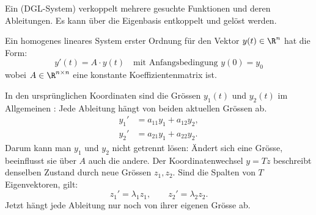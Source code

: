 \ZSFNewColumn
{}

\begin{runintext}
Ein  (DGL-System) verkoppelt mehrere gesuchte Funktionen und deren Ableitungen. Es kann über die Eigenbasis entkoppelt und gelöst werden.
\end{runintext}


\begin{defbox}
Ein homogenes lineares System erster Ordnung für den Vektor $y(t) \in \R^n$ hat die Form:
\[ y'(t) = A \cdot y(t) \quad \text{mit Anfangsbedingung } y(0) = y_0 \]
wobei $A \in \R^{n \times n}$ eine konstante Koeffizientenmatrix ist.
\end{defbox}


\begin{defbox}
In den ursprünglichen Koordinaten sind die Grössen $y_1(t)$ und $y_2(t)$ im Allgemeinen : Jede Ableitung hängt von beiden aktuellen Grössen ab.
\[
  \begin{aligned}
    y_1' &= a_{11}y_1+a_{12}y_2,\\
    y_2' &= a_{21}y_1+a_{22}y_2.
  \end{aligned}
\]
Darum kann man $y_1$ und $y_2$ nicht getrennt lösen: Ändert sich eine Grösse, beeinflusst sie über $A$ auch die andere.
Der Koordinatenwechsel $y=Tz$ beschreibt denselben Zustand durch neue Grössen $z_1,z_2$. Sind die Spalten von $T$ Eigenvektoren, gilt:
\[
  z_1'=\lambda_1z_1,\qquad z_2'=\lambda_2z_2.
\]
Jetzt hängt jede Ableitung nur noch von ihrer eigenen Grösse ab. 
\end{defbox}

